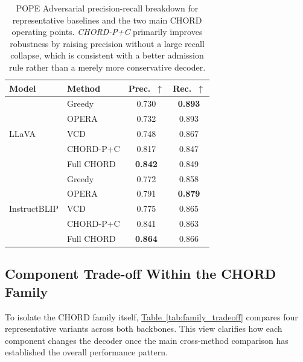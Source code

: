 \documentclass[sigconf,anonymous]{acmart}
\newcommand{\Tref}[1]{\hyperref[#1]{Table~\ref*{#1}}}
\begin{document}
\begin{table}[t]
\centering
\small
\setlength{\tabcolsep}{4pt}
    \caption{POPE Adversarial precision-recall breakdown for representative baselines and the two main CHORD operating points. \textit{CHORD-P+C} primarily improves robustness by raising precision without a large recall collapse, which is consistent with a better admission rule rather than a merely more conservative decoder.}
\label{tab:adv_breakdown}
\begin{tabular}{l l c c}
\toprule
\textbf{Model} & \textbf{Method} & Prec.~$\uparrow$ & Rec.~$\uparrow$ \\
\midrule
\multirow{5}{*}{LLaVA}
& Greedy        & 0.730 & \textbf{0.893} \\
& OPERA         & 0.732 & 0.893 \\
& VCD           & 0.748 & 0.867 \\
& CHORD-P+C     & 0.817 & 0.847 \\
& Full CHORD    & \textbf{0.842} & 0.849 \\
\midrule
\multirow{5}{*}{InstructBLIP}
& Greedy        & 0.772 & 0.858 \\
& OPERA         & 0.791 & \textbf{0.879} \\
& VCD           & 0.775 & 0.865 \\
& CHORD-P+C     & 0.841 & 0.863 \\
& Full CHORD    & \textbf{0.864} & 0.866 \\
\bottomrule
\end{tabular}
\end{table}

\subsection{Component Trade-off Within the CHORD Family}

To isolate the CHORD family itself, \Tref{tab:family_tradeoff} compares four representative variants across both backbones. This view clarifies how each component changes the decoder once the main cross-method comparison has established the overall performance pattern.
\end{document}
